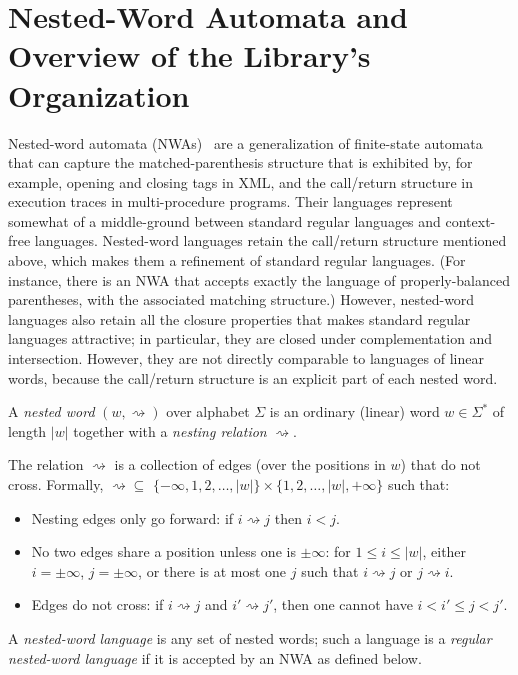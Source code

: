 \section{Nested-Word Automata and Overview of the Library's Organization}
\label{App:nwa-definition}

Nested-word automata (NWAs)~\cite{DLT:AM2006,JACM:AM2009} are a generalization
of finite-state automata that can capture the matched-parenthesis structure
that is exhibited by, for example, opening and closing tags in XML, and the
call/return structure in execution traces in multi-procedure
programs. Their languages represent somewhat of a middle-ground between
standard regular languages and context-free languages. Nested-word languages
retain the call/return structure mentioned above, which makes them a
refinement of standard regular languages. (For instance, there is an NWA that
accepts exactly the language of properly-balanced parentheses, with the
associated matching structure.) However, nested-word languages also retain all the closure
properties that makes standard regular languages attractive; in particular,
they are closed under complementation and intersection. However, they are not
directly comparable to languages of linear words, because the call/return
structure is an explicit part of each nested word.

\begin{definition}
  A \textsl{nested word} $(w,\rightsquigarrow)$ over alphabet $\Sigma$ is an
  ordinary (linear) word $w \in \Sigma^*$ of length $|w|$ together with a
  \textsl{nesting relation} $\rightsquigarrow$.

  The relation $\rightsquigarrow$ is a collection of edges (over the
  positions in $w$) that do not cross. Formally, $\rightsquigarrow \subseteq$
  $\{-\infty, 1, 2, \ldots, |w| \} \times \{1, 2, \ldots, |w|, +\infty\}$
  such that:
  \begin{itemize}
    \item
      Nesting edges only go forward: if $i \rightsquigarrow j$ then $i < j$.
    \item
      No two edges share a position unless one is $\pm\infty$: for $1
      \leq i \leq |w|$, either $i=\pm\infty$, $j=\pm\infty$, or
      there is at
      most one $j$ such that $i \rightsquigarrow j$ or $j \rightsquigarrow
      i$.
    \item
      Edges do not cross: if $i \rightsquigarrow j$ and $i' \rightsquigarrow
      j'$, then one cannot have $i < i' \leq j < j'$.
  \end{itemize}

  A \textsl{nested-word language} is any set of nested words; such a language
  is a \textsl{regular nested-word language} if it is accepted by an NWA as
  defined below.
\end{definition}

